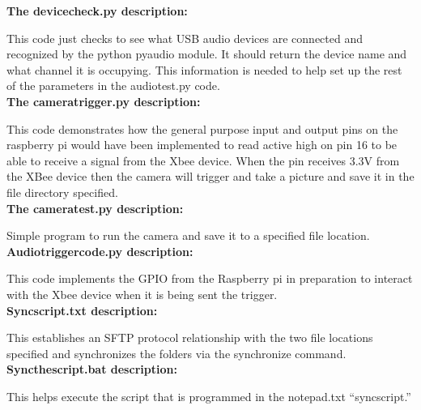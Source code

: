 		\noindent\textbf{ The devicecheck.py description:}
		\par This code just checks to see what USB audio devices are connected and recognized by the python pyaudio module. It should return the device name and what channel it is occupying. This information is needed to help set up the rest of the parameters in the audiotest.py code.\\
		
		\noindent\textbf{ The cameratrigger.py description:}
		\par This code demonstrates how the general purpose input and output pins on the raspberry pi would have been implemented to read active high on pin 16 to be able to receive a signal from the Xbee device. When the pin receives 3.3V from the XBee device then the camera will trigger and take a picture and save it in the file directory specified. \\
		
		\noindent\textbf{ The cameratest.py description:}
		\par Simple program to run the camera and save it to a specified file location.\\
		
		\noindent\textbf{ Audiotriggercode.py description:}
		\par This code implements the GPIO from the Raspberry pi in preparation to interact with the Xbee device when it is being sent the trigger.\\
	
		\noindent\textbf{ Syncscript.txt description:}
		\par This establishes an SFTP protocol relationship with the two file locations specified and synchronizes the folders via the synchronize command.\\
	
		\noindent\textbf{ Syncthescript.bat description:}
		\par This helps execute the script that is programmed in the notepad.txt “syncscript.”\\
		
		
	
